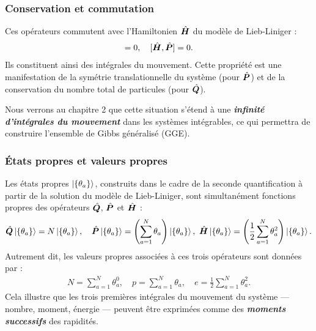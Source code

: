 \subsubsection{Conservation et commutation}
Ces opérateurs commutent avec l’Hamiltonien $\hat{\bm{H}}$ du modèle de Lieb-Liniger :
\begin{eqnarray}
[ \operator{H} , \operator{Q} ] = 0, \quad [ \operator{H} , \operator{P} ] = 0.
\end{eqnarray}
Ils constituent ainsi des intégrales du mouvement. Cette propriété est une manifestation de la symétrie translationnelle du système (pour $\hat{\bm{P}}$) et de la conservation du nombre total de particules (pour $\hat{\bm{Q}}$).

\begin{mdframed}[
	linewidth=0.5pt, 
	backgroundcolor=gray!5, 
	roundcorner=50pt,	
	innerleftmargin=5pt,
    innerrightmargin=5pt,
    innertopmargin=5pt,
    innerbottommargin=2pt,
    leftmargin=2pt,
    rightmargin=2pt
	]
	Nous verrons au chapitre 2 que cette situation s’étend à une {\bf \em infinité d’intégrales du mouvement} dans les systèmes intégrables, ce qui permettra de construire l’ensemble de Gibbs généralisé (GGE).
\end{mdframed}

\subsubsection{États propres et valeurs propres}
Les états propres $\ket{\{\theta_a\}}$, construits dans le cadre de la seconde quantification à partir de la solution du modèle de Lieb-Liniger, sont simultanément fonctions propres des opérateurs $\hat{\bm{Q}}$, $\hat{\bm{P}}$ et $\hat{\bm{H}}$ :
\begin{eqnarray}
\hat{\bm{Q}} \ket{\{\theta_a\}} = N \ket{\{\theta_a\}}, \quad
\hat{\bm{P}} \ket{\{\theta_a\}} = \left( \sum_{a=1}^N \theta_a \right) \ket{\{\theta_a\}}, \
\hat{\bm{H}} \ket{\{\theta_a\}} = \left( \frac{1}{2} \sum_{a=1}^N \theta_a^2 \right) \ket{\{\theta_a\}}.
\end{eqnarray}
Autrement dit, les valeurs propres associées à ces trois opérateurs sont données par :
\begin{eqnarray}
N = \sum_{a = 1}^N \theta_a^0, \quad p = \sum_{a = 1}^N \theta_a, \quad e = \frac{1}{2} \sum_{a = 1}^N \theta_a^2.
\end{eqnarray}
Cela illustre que les trois premières intégrales du mouvement du système — nombre, moment, énergie — peuvent être exprimées comme des {\bf \em moments successifs} des rapidités.	

